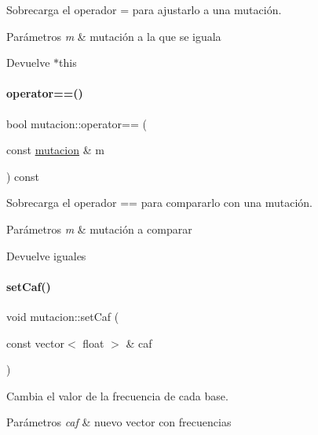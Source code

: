 Sobrecarga el operador = para ajustarlo a una mutación. 


\begin{DoxyParams}{Parámetros}
{\em m} & mutación a la que se iguala \\
\hline
\end{DoxyParams}
\begin{DoxyReturn}{Devuelve}
$\ast$this 
\end{DoxyReturn}
\hypertarget{classmutacion_a0c67e3d41ce47338856954f60815bacd}{}\label{classmutacion_a0c67e3d41ce47338856954f60815bacd} 
\paragraph{\texorpdfstring{operator==()}{operator==()}}
{\footnotesize\ttfamily bool mutacion\+::operator== (\begin{DoxyParamCaption}\item[{const \hyperlink{classmutacion}{mutacion} \&}]{m }\end{DoxyParamCaption}) const}



Sobrecarga el operador == para compararlo con una mutación. 


\begin{DoxyParams}{Parámetros}
{\em m} & mutación a comparar \\
\hline
\end{DoxyParams}
\begin{DoxyReturn}{Devuelve}
iguales 
\end{DoxyReturn}
\hypertarget{classmutacion_a52b79ec257cc96ad5c38a34ac4f2e827}{}\label{classmutacion_a52b79ec257cc96ad5c38a34ac4f2e827} 
\paragraph{\texorpdfstring{set\+Caf()}{setCaf()}}
{\footnotesize\ttfamily void mutacion\+::set\+Caf (\begin{DoxyParamCaption}\item[{const vector$<$ float $>$ \&}]{caf }\end{DoxyParamCaption})}



Cambia el valor de la frecuencia de cada base. 


\begin{DoxyParams}{Parámetros}
{\em caf} & nuevo vector con frecuencias \\
\hline
\end{DoxyParams}
\hypertarget{classmutacion_a147ee1f35c78ab0b7cf891067bf2e336}{}\label{classmutacion_a147ee1f35c78ab0b7cf891067bf2e336} 
